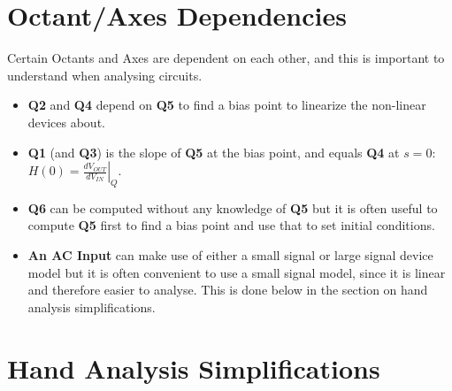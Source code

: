 \section{Octant/Axes Dependencies}

Certain Octants and Axes are dependent on each other, and this is important to
understand when analysing circuits.
\begin{itemize}
    \item \textbf{Q2} and \textbf{Q4} depend on \textbf{Q5} to find a bias
      point to linearize the non-linear devices about.
    \item \textbf{Q1} (and \textbf{Q3}) is the slope of \textbf{Q5} at the bias
      point, and equals \textbf{Q4} at \(s = 0\):
      \(H(0) = \left.\frac{dV_{OUT}}{dV_{IN}}\right|_{Q}\).
    \item \textbf{Q6} can be computed without any knowledge of \textbf{Q5}
      but it is often useful to compute \textbf{Q5} first to find a bias
      point and use that to set initial conditions.
    \item \textbf{An AC Input} can make use of either a small signal or
      large signal device model but it is often convenient to use a small
      signal model, since it is linear and therefore easier to analyse.
      This is done below in the section on hand analysis simplifications.
\end{itemize}

\section{Hand Analysis Simplifications}

